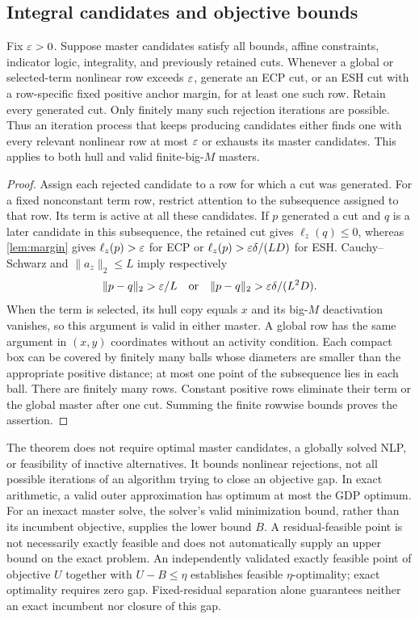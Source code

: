 \subsection{Integral candidates and objective bounds}
\begin{theorem}\label{thm:integral}
Fix $\varepsilon>0$. Suppose master candidates satisfy all bounds, affine constraints, indicator logic, integrality, and previously retained cuts. Whenever a global or selected-term nonlinear row exceeds $\varepsilon$, generate an ECP cut, or an ESH cut with a row-specific fixed positive anchor margin, for at least one such row. Retain every generated cut. Only finitely many such rejection iterations are possible. Thus an iteration process that keeps producing candidates either finds one with every relevant nonlinear row at most $\varepsilon$ or exhausts its master candidates. This applies to both hull and valid finite-big-$M$ masters.
\end{theorem}
\begin{proof}
Assign each rejected candidate to a row for which a cut was generated. For a fixed nonconstant term row, restrict attention to the subsequence assigned to that row. Its term is active at all these candidates. If $p$ generated a cut and $q$ is a later candidate in this subsequence, the retained cut gives $\ell_z(q)\le0$, whereas \cref{lem:margin} gives $\ell_z(p)>\varepsilon$ for ECP or $\ell_z(p)>\varepsilon\delta/(LD)$ for ESH. Cauchy--Schwarz and $\|a_z\|_2\le L$ imply respectively
\[
 \|p-q\|_2>\varepsilon/L\quad\hbox{or}\quad
 \|p-q\|_2>\varepsilon\delta/(L^2D).
\]
When the term is selected, its hull copy equals $x$ and its big-$M$ deactivation vanishes, so this argument is valid in either master. A global row has the same argument in $(x,y)$ coordinates without an activity condition. Each compact box can be covered by finitely many balls whose diameters are smaller than the appropriate positive distance; at most one point of the subsequence lies in each ball. There are finitely many rows. Constant positive rows eliminate their term or the global master after one cut. Summing the finite rowwise bounds proves the assertion.
\end{proof}
The theorem does not require optimal master candidates, a globally solved NLP, or feasibility of inactive alternatives. It bounds nonlinear rejections, not all possible iterations of an algorithm trying to close an objective gap. In exact arithmetic, a valid outer approximation has optimum at most the GDP optimum. For an inexact master solve, the solver's valid minimization bound, rather than its incumbent objective, supplies the lower bound $B$. A residual-feasible point is not necessarily exactly feasible and does not automatically supply an upper bound on the exact problem. An independently validated exactly feasible point of objective $U$ together with $U-B\le\eta$ establishes feasible $\eta$-optimality; exact optimality requires zero gap. Fixed-residual separation alone guarantees neither an exact incumbent nor closure of this gap.

